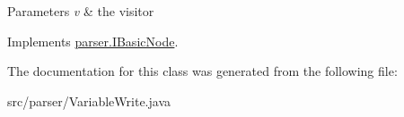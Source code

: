 \begin{DoxyParams}{Parameters}
{\em v} & the visitor \\
\hline
\end{DoxyParams}


Implements \hyperlink{interfaceparser_1_1_i_basic_node_af8790b7076c59e00781ba3d4118757cd}{parser.\+I\+Basic\+Node}.



The documentation for this class was generated from the following file\+:\begin{DoxyCompactItemize}
\item 
src/parser/Variable\+Write.\+java\end{DoxyCompactItemize}
